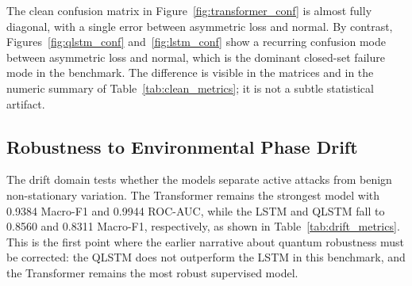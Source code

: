 The clean confusion matrix in Figure~\ref{fig:transformer_conf} is almost fully diagonal, with a single error between asymmetric loss and normal. By contrast, Figures~\ref{fig:qlstm_conf} and~\ref{fig:lstm_conf} show a recurring confusion mode between asymmetric loss and normal, which is the dominant closed-set failure mode in the benchmark. The difference is visible in the matrices and in the numeric summary of Table~\ref{tab:clean_metrics}; it is not a subtle statistical artifact.
\begin{table}[!htbp]
\centering
\caption{Same-Domain Supervised Performance Metrics (CLEAN)}
\label{tab:clean_metrics}
\small
{}
\end{table}
\subsection{Robustness to Environmental Phase Drift}
The drift domain tests whether the models separate active attacks from benign non-stationary variation. The Transformer remains the strongest model with 0.9384 Macro-F1 and 0.9944 ROC-AUC, while the LSTM and QLSTM fall to 0.8560 and 0.8311 Macro-F1, respectively, as shown in Table~\ref{tab:drift_metrics}. This is the first point where the earlier narrative about quantum robustness must be corrected: the QLSTM does not outperform the LSTM in this benchmark, and the Transformer remains the most robust supervised model.
\begin{table}[!htbp]
\centering
\caption{Model Robustness under Environmental Phase Drift (DRIFT)}
\label{tab:drift_metrics}
\small
{}
\end{table}

